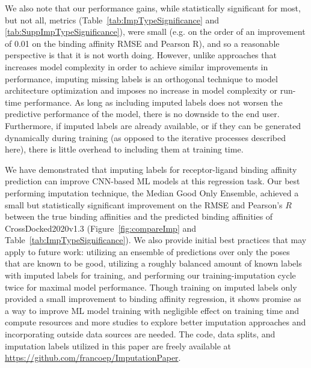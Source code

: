 \documentclass[journal=jcim,manuscript=article]{achemso}
\begin{document}
We also note that our performance gains, while statistically significant for most, but not all, metrics (Table~\ref{tab:ImpTypeSignificance} and \ref{tab:SuppImpTypeSignificance}), were small (e.g. on the order of an improvement of 0.01 on the binding affinity RMSE and Pearson R), and so a reasonable perspective is that it is not worth doing. 
However, unlike approaches that increases model complexity in order to achieve similar improvements in performance,\cite{crossdocked2020,bapa,fusionAff,pafnuncy,kdeep,onionnet} imputing missing labels is an orthogonal technique to model architecture optimization and imposes no increase in model complexity or run-time performance. 
As long as including imputed labels does not worsen the predictive performance of the model, there is no downside to the end user. 
Furthermore, if imputed labels are already available, or if they can be generated dynamically during training (as opposed to the iterative processes described here), there is little overhead to including them at training time.

We have demonstrated that imputing labels for receptor-ligand binding affinity prediction can improve CNN-based ML models at this regression task.
Our best performing imputation technique, the Median Good Only Ensemble, achieved a small but statistically significant improvement on the RMSE and Pearson's $R$ between the true binding affinities and the predicted binding affinities of CrossDocked2020v1.3 (Figure~\ref{fig:compareImp} and Table~\ref{tab:ImpTypeSignificance}).
We also provide initial best practices that may apply to future work: utilizing an ensemble of predictions over only the poses that are known to be good, utilizing a roughly balanced amount of known labels with imputed labels for training, and performing our training-imputation cycle twice for maximal model performance.
Though training on imputed labels only provided a small improvement to binding affinity regression, it shows promise as a way to improve ML model training with negligible effect on training time and compute resources and more studies to explore better imputation approaches and incorporating outside data sources are needed.
The code, data splits, and imputation labels utilized in this paper are freely available at \url{https://github.com/francoep/ImputationPaper}.
\end{document}
